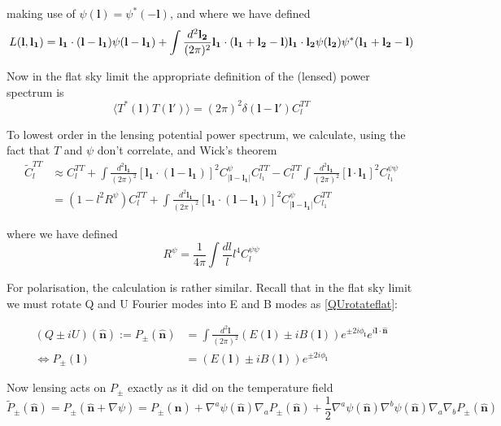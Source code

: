 \documentclass[a4paper,10pt]{article}
\renewcommand{\v}[1]{\mathbf{#1}}
\newcommand{\half}{\frac{1}{2}}
\newcommand{\finttwo}[1]{\int \frac{d^2 \v{#1}}{(2\pi)^2}}
\newcommand{\unit}[1]{\hat{\v{#1}}}
\begin{document}
making use of $\psi(\v{l})=\psi^*(-\v{l})$, and where we have defined 
\begin{equation}
L(\v{l},\v{l_1}) = \v{l_1}\cdot(\v{l}-\v{l_1})\psi(\v{l}-\v{l_1})+\finttwo{l_2}\v{l_1}\cdot(\v{l_1}+\v{l_2}-\v{l})\v{l_1}\cdot\v{l_2}\psi(\v{l_2})\psi^*(\v{l_1}+\v{l_2}-\v{l})\\
\end{equation}

Now in the flat sky limit the appropriate definition of  the (lensed) power spectrum is
\begin{equation}
\langle T^*(\v{l})T(\v{l}')\rangle = (2\pi)^2\delta(\v{l}-\v{l}')C_l^{TT}
\end{equation}

To lowest order in the lensing potential power spectrum, we calculate, using the fact that $T$ and $\psi$ don't correlate, and Wick's theorem
\begin{equation}\begin{split}
\tilde{C}_l^{T T} &\approx C_l^{T T}+\finttwo{l_1}[ \v{l_1}\cdot(\v{l}-\v{l_1})]^2 C^\psi_{|\v{l}-\v{l_1}|}C_{l_1}^{TT} - C_l^{TT}\finttwo{l_1} [\v{l}\cdot\v{l_1}]^2C_{l_1}^{\psi\psi}\\
&=(1-l^2R^\psi)C_l^{TT}+\finttwo{l_1}[ \v{l_1}\cdot(\v{l}-\v{l_1})]^2 C^{\psi}_{|\v{l}-\v{l_1}|}C_{l_1}^{TT}
\end{split}\end{equation}

where we have defined
\begin{equation}
R^\psi = \frac{1}{4\pi}\int \frac{dl}{l} l^4 C_l^{\psi\psi}
\end{equation}

For polarisation, the calculation is rather similar. Recall that in the flat sky limit we must rotate Q and U Fourier modes into E and B modes as \ref{QUrotateflat}:

\begin{equation}\begin{split}
(Q\pm iU)(\unit{n}) := P_{\pm} (\unit{n}) &= \finttwo{l}(E(\v{l})\pm i B(\v{l}))e^{\pm 2i\phi_{\v{l}}}e^{i\v{l}\cdot\unit{n}}\\
\Leftrightarrow  P_{\pm}(\v{l}) &= (E(\v{l})\pm i B(\v{l}))e^{\pm 2i\phi_{\v{l}}}
\label{relationship}
\end{split}\end{equation}

Now lensing acts on $P_{\pm}$ exactly as it did on the temperature field 
\begin{equation}
\tilde{P}_{\pm}(\unit{n}) = P_{\pm}(\unit{n}+\nabla\psi) =P_{\pm}(\unit{n})+\nabla^a\psi(\unit{n})\nabla_aP_{\pm}(\unit{n})+\half\nabla^a\psi(\unit{n})\nabla^b\psi(\unit{n})\nabla_a\nabla_bP_{\pm}(\unit{n})
\end{equation}
\end{document}
